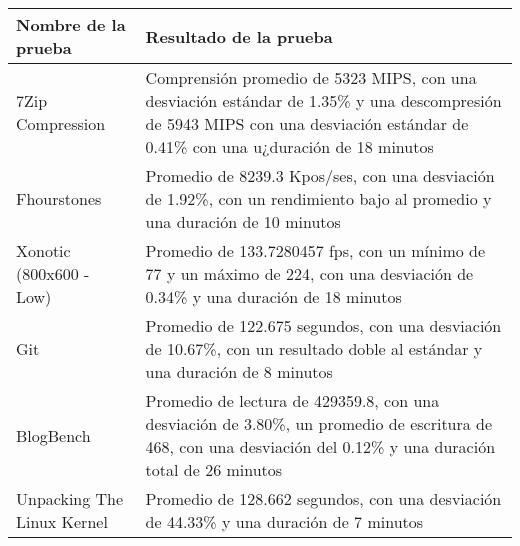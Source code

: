\documentclass[12pt]{article}
\begin{document}
\begin{table}[!htb]
    \centering
    \begin{tabular}{|p{5cm}|p{9cm}|}
        \hline
        \textbf{Nombre de la prueba} & \textbf{Resultado de la prueba}\\
        \hline
        7Zip Compression & Comprensión promedio de 5323 MIPS, \newline
        con una desviación estándar de 1.35\% \newline
        y una descompresión de 5943 MIPS \newline
        con una desviación estándar de 0.41\% con una u¿duración de 18 minutos\\
        \hline
        Fhourstones & Promedio de 8239.3 Kpos/ses, \newline
        con una desviación de 1.92\%, \newline
        con un rendimiento bajo al promedio \newline
        y una duración de 10 minutos \\
        \hline
        Xonotic (800x600 - Low) & Promedio de 133.7280457 fps, \newline
        con un mínimo de 77 y un máximo de 224, \newline
        con una desviación de 0.34\% \newline
        y una duración de 18 minutos \\
        \hline
        Git & Promedio de 122.675 segundos, \newline
        con una desviación de 10.67\%, \newline
        con un resultado doble al estándar \newline
        y una duración de 8 minutos \\
        \hline
        BlogBench & Promedio de lectura de 429359.8, \newline
        con una desviación de 3.80\%, \newline
        un promedio de escritura de 468, \newline
        con una desviación del 0.12\% \newline
        y una duración total de 26 minutos \\
        \hline
        Unpacking The Linux Kernel & Promedio de 128.662 segundos, \newline
        con una desviación de 44.33\% \newline
        y una duración de 7 minutos \\

\end{tabular}
\end{table}
\end{document}
